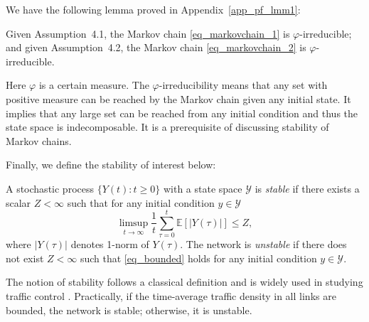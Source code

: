We have the following lemma proved in Appendix~\ref{app_pf_lmm1}:
\begin{lmm} 
\label{lmm_1}
Given Assumption~4.1, the Markov chain \eqref{eq_markovchain_1} is $\varphi$-irreducible; and given Assumption~4.2, the Markov chain \eqref{eq_markovchain_2} is $\varphi$-irreducible.
\end{lmm}

Here $\varphi$ is a certain measure. The $\varphi$-irreducibility means that any set with positive measure can be reached by the Markov chain given any initial state. It implies that any large set can be reached from any initial condition and thus the state space is indecomposable. It is a prerequisite of discussing stability of Markov chains.

Finally, we define the stability of interest below:
\begin{dfn}
A stochastic process $\{Y(t):t\geq0\}$ with a state space $\mathcal{Y}$ is \emph{stable} if there exists a scalar $Z<\infty$ such that for any initial condition $y\in\mathcal{Y}$
\begin{equation}\label{eq_bounded}
  \limsup_{t\to\infty}\frac{1}{t}\sum_{\tau=0}^t\mathbb {E}[|Y(\tau)|] \le Z,
\end{equation}
where $|Y(\tau)|$ denotes 1-norm of $Y(\tau)$. The network is \emph{unstable} if there does not exist $Z<\infty$ such that \eqref{eq_bounded} holds for any initial condition $y\in\mathcal{Y}$.
\end{dfn}

The notion of stability follows a classical definition \cite{dai1995stability} and is widely used in studying traffic control \cite{barman2023throughput}. Practically, if the time-average traffic density in all links are bounded, the network is stable; otherwise, it is unstable.








